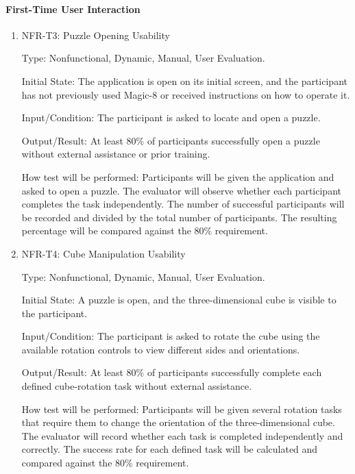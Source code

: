 \documentclass[12pt, titlepage]{article}
\begin{document}
\paragraph{First-Time User Interaction}

\begin{enumerate}

\item{NFR-T3: Puzzle Opening Usability\\}

Type: Nonfunctional, Dynamic, Manual, User Evaluation.

Initial State: The application is open on its initial screen, and the
participant has not previously used Magic-8 or received instructions
on how to operate it.

Input/Condition: The participant is asked to locate and open a puzzle.

Output/Result: At least 80\% of participants successfully open a puzzle
without external assistance or prior training.

How test will be performed: Participants will be given the application
and asked to open a puzzle. The evaluator will observe whether each
participant completes the task independently. The number of successful
participants will be recorded and divided by the total number of
participants. The resulting percentage will be compared against the
80\% requirement.

\item{NFR-T4: Cube Manipulation Usability\\}

Type: Nonfunctional, Dynamic, Manual, User Evaluation.

Initial State: A puzzle is open, and the three-dimensional cube is
visible to the participant.

Input/Condition: The participant is asked to rotate the cube using
the available rotation controls to view different sides and orientations.

Output/Result: At least 80\% of participants successfully complete
each defined cube-rotation task without external assistance.

How test will be performed: Participants will be given several
rotation tasks that require them to change the orientation of the
three-dimensional cube. The evaluator will record whether each task
is completed independently and correctly. The success rate for each
defined task will be calculated and compared against the 80\% requirement.


\end{enumerate}
\end{document}
